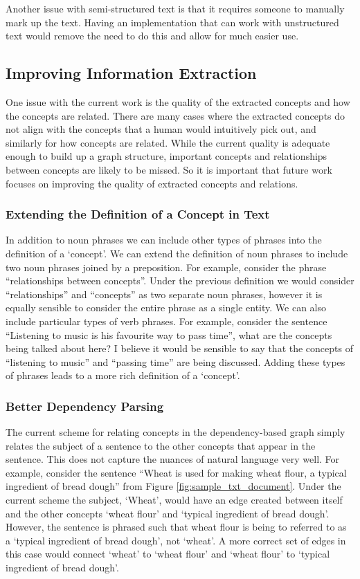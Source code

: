 \documentclass[12pt]{article}
\begin{document}
Another issue with semi-structured text is that it requires someone to manually mark up the text. Having an implementation that can work with unstructured text would remove the need to do this and allow for much easier use.

\subsection{Improving Information Extraction}
One issue with the current work is the quality of the extracted concepts and how the concepts are related. There are many cases where the extracted concepts do not align with the concepts that a human would intuitively pick out, and similarly for how concepts are related. While the current quality is adequate enough to build up a graph structure, important concepts and relationships between concepts are likely to be missed. So it is important that future work focuses on improving the quality of extracted concepts and relations.

\subsubsection{Extending the Definition of a Concept in Text}
In addition to noun phrases we can include other types of phrases into the definition of a `concept'. We can extend the definition of noun phrases to include two noun phrases joined by a preposition. For example, consider the phrase ``relationships between concepts''. Under the previous definition we would consider ``relationships'' and ``concepts'' as two separate noun phrases, however it is equally sensible to consider the entire phrase as a single entity. We can also include particular types of verb phrases. For example, consider the sentence ``Listening to music is his favourite way to pass time'', what are the concepts being talked about here? I believe it would be sensible to say that the concepts of ``listening to music'' and ``passing time'' are being discussed. Adding these types of phrases leads to a more rich definition of a `concept'. 

\subsubsection{Better Dependency Parsing}
The current scheme for relating concepts in the dependency-based graph simply relates the subject of a sentence to the other concepts that appear in the sentence. This does not capture the nuances of natural language very well. For example, consider the sentence ``Wheat is used for making wheat flour, a typical ingredient of bread dough'' from Figure \ref{fig:sample_txt_document}. Under the current scheme the subject, `Wheat', would have an edge created between itself and the other concepts `wheat flour' and `typical ingredient of bread dough'. However, the sentence is phrased such that wheat flour is being to referred to as a `typical ingredient of bread dough', not `wheat'. A more correct set of edges in this case would connect `wheat' to `wheat flour' and `wheat flour' to `typical ingredient of bread dough'. 
\end{document}
